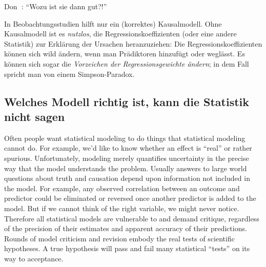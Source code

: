 \documentclass[
  ngerman,
  letterpaper,
  twoside,
  open=any]{scrbook}
\theoremstyle{definition}
\theoremstyle{plain}
\theoremstyle{definition}
\theoremstyle{definition}
\theoremstyle{definition}
\theoremstyle{definition}
\theoremstyle{remark}
\begin{document}
Don 🧑: \enquote{Wozu ist sie dann gut?!}

\begin{tcolorbox}[enhanced jigsaw, arc=.35mm, bottomrule=.15mm, bottomtitle=1mm, breakable, colback=white, colbacktitle=quarto-callout-important-color!10!white, colframe=quarto-callout-important-color-frame, coltitle=black, left=2mm, leftrule=.75mm, opacityback=0, opacitybacktitle=0.6, rightrule=.15mm, title=\textcolor{quarto-callout-important-color}{\faExclamation}\hspace{0.5em}{Wichtig}, titlerule=0mm, toprule=.15mm, toptitle=1mm]

In Beobachtungsstudien hilft nur ein (korrektes) Kausalmodell. Ohne
Kausalmodell ist es \emph{nutzlos}, die Regressionskoeffizienten (oder
eine andere Statistik) zur Erklärung der Ursachen heranzuziehen: Die
Regressionskoeffizienten können sich wild ändern, wenn man Prädiktoren
hinzufügt oder weglässt. Es können sich sogar die \emph{Vorzeichen der
Regressionsgewichte ändern}; in dem Fall spricht man von einem
Simpson-Paradox.

\end{tcolorbox}

\subsection{Welches Modell richtig ist, kann die Statistik nicht
sagen}\label{welches-modell-richtig-ist-kann-die-statistik-nicht-sagen}

\begin{displayquote}
Often people want statistical modeling to do things that statistical
modeling cannot do. For example, we'd like to know whether an effect is
\enquote{real} or rather spurious. Unfortunately, modeling merely
quantifies uncertainty in the precise way that the model understands the
problem. Usually answers to large world questions about truth and
causation depend upon information not included in the model. For
example, any observed correlation between an outcome and predictor could
be eliminated or reversed once another predictor is added to the model.
But if we cannot think of the right variable, we might never notice.
Therefore all statistical models are vulnerable to and demand critique,
regardless of the precision of their estimates and apparent accuracy of
their predictions. Rounds of model criticism and revision embody the
real tests of scientific hypotheses. A true hypothesis will pass and
fail many statistical \enquote{tests} on its way to acceptance.
\end{displayquote}
\end{document}
